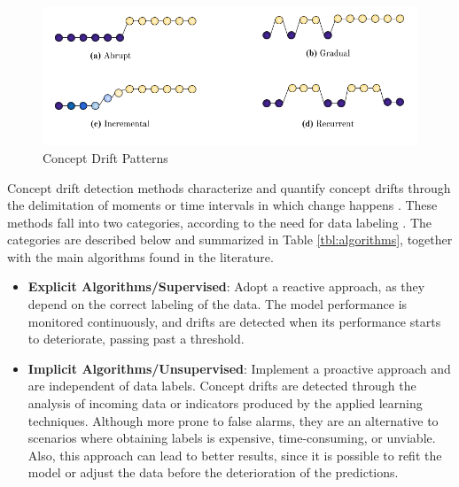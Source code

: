 \documentclass[preprint,12pt]{elsarticle}
\begin{document}
\begin{figure}[h!]
\begin{center}
    \includegraphics[scale=0.7]{img/concept_drift_patterns.png}
    \caption{Concept Drift Patterns}
    \label{fig:concept_drift_patterns}
\end{center}
\end{figure}

Concept drift detection methods characterize and quantify concept drifts through the delimitation of moments or time intervals in which change happens \cite{Basseville:1993:DAC:151741}.
%
These methods fall into two categories, according to the need for data labeling \cite{Zliobaite:2010}.
The categories are described below and summarized in Table \ref{tbl:algorithms}, together with the main algorithms found in the literature.

\begin{itemize}
    \item \textbf{Explicit Algorithms/Supervised}: Adopt a reactive approach, as they depend on the correct labeling of the data.
    The model performance is monitored continuously, and drifts are detected when its performance starts to deteriorate, passing past a threshold.
    \item \textbf{Implicit Algorithms/Unsupervised}: Implement a proactive approach and are independent of data labels.
    Concept drifts are detected through the analysis of incoming data or indicators produced by the applied learning techniques.
    Although more prone to false alarms, they are an alternative to scenarios where obtaining labels is expensive, time-consuming, or unviable.
    Also, this approach can lead to better results, since it is possible to refit the model or adjust the data before the deterioration of the predictions.
\end{itemize}
\end{document}
